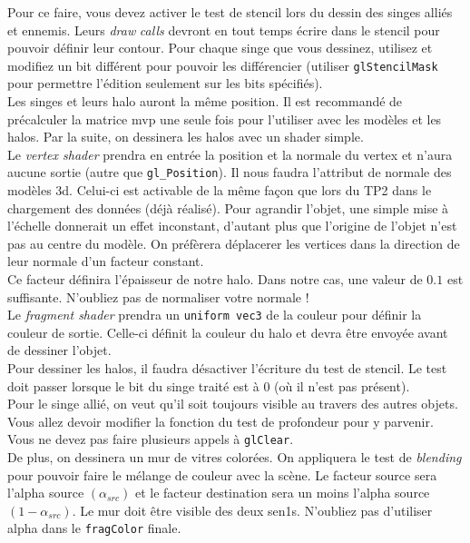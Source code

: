 \documentclass{article}[letterpaper, 11pt]
\begin{document}
Pour ce faire, vous devez activer le test de stencil lors du dessin des singes alliés et ennemis.
Leurs \textit{draw} \textit{calls} devront en tout temps écrire dans le stencil pour pouvoir définir leur contour.
Pour chaque singe que vous dessinez, utilisez et modifiez un bit différent pour pouvoir les différencier (utiliser \texttt{glStencilMask} pour permettre l'édition seulement sur les bits spécifiés).\vspace*{11pt}
\\
Les singes et leurs halo auront la même position. Il est recommandé de précalculer la matrice mvp
une seule fois pour l'utiliser avec les modèles et les halos. Par la suite, on dessinera les halos avec
un shader simple.\vspace*{11pt}
\\
Le \textit{vertex shader} prendra en entrée la position et la normale du vertex et n'aura aucune sortie (autre que \texttt{gl\_Position}). Il nous faudra l'attribut de normale des modèles 3d. Celui-ci est activable de la même façon que lors du TP2 dans le chargement des données (déjà réalisé). Pour agrandir l'objet, une simple mise à l'échelle donnerait un effet inconstant, d'autant plus que l'origine de l'objet n'est pas au centre du modèle. On préfèrera déplacerer les vertices dans la direction de leur normale d'un facteur constant.
\\
Ce facteur définira l'épaisseur de notre halo. Dans notre cas, une valeur de $0.1$ est suffisante. N'oubliez pas de normaliser votre normale !\vspace*{11pt}
\\
Le \textit{fragment shader} prendra un \texttt{uniform vec3} de la couleur pour définir la couleur de sortie. Celle-ci définit la couleur du halo et devra être envoyée avant de dessiner l'objet.\vspace*{11pt}
\\
Pour dessiner les halos, il faudra désactiver l'écriture du test de stencil. Le test doit passer lorsque le bit du singe traité est à 0 (où il n'est pas présent).\vspace*{11pt}
\\
Pour le singe allié, on veut qu'il soit toujours visible au travers des autres objets. Vous allez devoir
modifier la fonction du test de profondeur pour y parvenir.
\vspace*{11pt}
\\
Vous ne devez pas faire plusieurs appels à \texttt{glClear}.\vspace*{11pt}
\\
De plus, on dessinera un mur de vitres colorées. On appliquera le test de \textit{blending} pour pouvoir faire le mélange de couleur avec la scène. Le facteur source sera l'alpha source $(\alpha_{src})$ et le facteur destination sera un moins l'alpha source $(1-\alpha_{src})$.
Le mur doit être visible des deux sen1s. N'oubliez pas d'utiliser alpha dans le \texttt{fragColor} finale.
\end{document}
